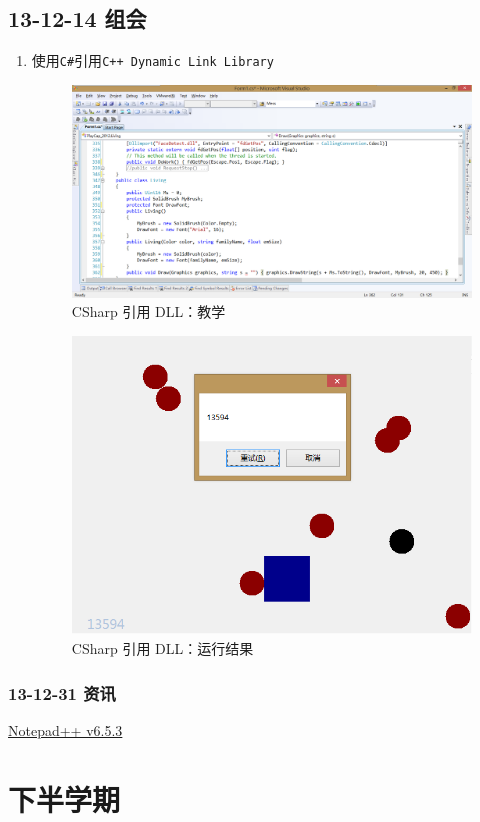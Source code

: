 \documentclass[]{report}
\begin{document}
\section{13-12-14 组会}
\begin{enumerate}
	\item 使用\verb|C#|引用\verb|C++ Dynamic Link Library|
\begin{figure}
\centering
\includegraphics[width=1\linewidth]{./PIC/PlayCap}
\caption{CSharp 引用 DLL：教学}
\label{fig:PlayCap}
\end{figure}
\begin{figure}
\centering
\includegraphics[width=0.7\linewidth]{./PIC/PlayCapO}
\caption{CSharp 引用 DLL：运行结果}
\label{fig:PlayCapO}
\end{figure}
\end{enumerate}
	\subsection{13-12-31 资讯}
		\href{http://notepad-plus-plus.org/zh/download/v6.5.3.html}{Notepad++ v6.5.3}
\chapter{下半学期}
\end{document}

